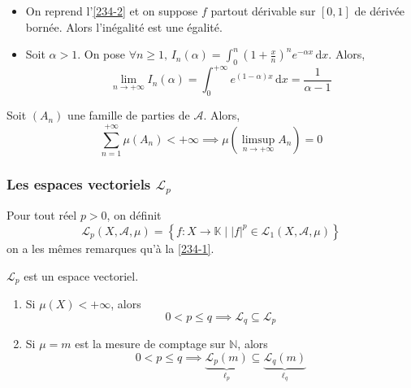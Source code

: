   \begin{example}
    \begin{itemize}
      \item On reprend l'\cref{234-2} et on suppose $f$ partout dérivable sur $[0,1]$ de dérivée bornée. Alors l'inégalité est une égalité.
      \item Soit $\alpha > 1$. On pose $\forall n \geq 1, \, I_n(\alpha) = \int_0^n \left( 1 + \frac{x}{n} \right)^n e^{-\alpha x} \, \mathrm{d}x$. Alors,
      \[ \lim_{n \rightarrow +\infty} I_n(\alpha) = \int_0^{+\infty} e^{(1-\alpha)x} \, \mathrm{d}x = \frac{1}{\alpha - 1} \]
    \end{itemize}
  \end{example}

  \begin{application}
    Soit $(A_n)$ une famille de parties de $\mathcal{A}$. Alors,
    \[ \sum_{n=1}^{+\infty} \mu(A_n) < +\infty \implies \mu \left( \limsup_{n \rightarrow +\infty} A_n \right) = 0 \]
  \end{application}

  \subsubsection{Les espaces vectoriels \texorpdfstring{$\mathcal{L}_p$}{Lₚ}}


  \begin{definition}
    Pour tout réel $p > 0$, on définit
    \[ \mathcal{L}_p(X, \mathcal{A}, \mu) = \left\{ f : X \rightarrow \mathbb{K} \mid |f|^p \in \mathcal{L}_1(X, \mathcal{A}, \mu) \right\} \]
    on a les mêmes remarques qu'à la \cref{234-1}.
  \end{definition}

  \begin{proposition}
    $\mathcal{L}_p$ est un espace vectoriel.
  \end{proposition}

  \begin{proposition}
    \begin{enumerate}[label=(\roman*)]
      \item Si $\mu(X) < +\infty$, alors
      \[ 0 < p \leq q \implies \mathcal{L}_q \subseteq \mathcal{L}_p \]
      \item Si $\mu = m$ est la mesure de comptage sur $\mathbb{N}$, alors
      \[ 0 < p \leq q \implies \underbrace{\mathcal{L}_p(m)}_{\ell_p} \subseteq \underbrace{\mathcal{L}_q(m)}_{\ell_q} \]
    \end{enumerate}
  \end{proposition}

